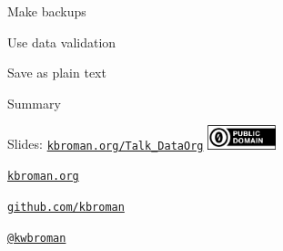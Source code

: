 \documentclass[aspectratio=169,12pt,t]{beamer}
\begin{document}
\begin{frame}[c]{Make backups}



  \note{
  }
\end{frame}



\begin{frame}[c]{Use data validation}



  \note{
  }
\end{frame}




\begin{frame}[c]{Save as plain text}



  \note{
  }
\end{frame}




\begin{frame}[c]{Summary}



  \note{

  }

\end{frame}






\begin{frame}[c]{}

\Large

Slides: \href{https://kbroman.org/Talk_DataOrg}{\tt kbroman.org/Talk\_DataOrg}
\hfill \includegraphics[height=7mm]{Figs/cc-zero.png}

\vspace{7mm}

\href{https://kbroman.org}{\tt \lolit kbroman.org}

\vspace{7mm}

\href{https://github.com/kbroman}{\tt \lolit github.com/kbroman}

\vspace{7mm}

\href{https://twitter.com/kwbroman}{\tt \lolit @kwbroman}



\end{frame}
\end{document}
